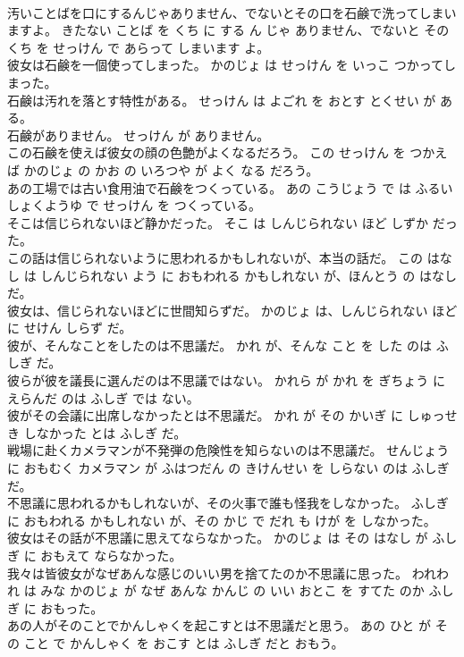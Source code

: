 \documentclass[8pt]{extreport}
\begin{document}
\begin{CJK}{UTF8}{min}
\\	汚いことばを口にするんじゃありません、でないとその口を石鹸で洗ってしまいますよ。	きたない ことば を くち に する ん じゃ ありません、でないと その くち を せっけん で あらって しまいます よ。	
\\	彼女は石鹸を一個使ってしまった。	かのじょ は せっけん を いっこ つかってしまった。	
\\	石鹸は汚れを落とす特性がある。	せっけん は よごれ を おとす とくせい が ある。	
\\	石鹸がありません。	せっけん が ありません。	
\\	この石鹸を使えば彼女の顔の色艶がよくなるだろう。	この せっけん を つかえば かのじょ の かお の いろつや が よく なる だろう。	
\\	あの工場では古い食用油で石鹸をつくっている。	あの こうじょう で は ふるい しょくようゆ で せっけん を つくっている。	
\\	そこは信じられないほど静かだった。	そこ は しんじられない ほど しずか だった。	
\\	この話は信じられないように思われるかもしれないが、本当の話だ。	この はなし は しんじられない よう に おもわれる かもしれない が、ほんとう の はなし だ。	
\\	彼女は、信じられないほどに世間知らずだ。	かのじょ は、しんじられない ほど に せけん しらず だ。	
\\	彼が、そんなことをしたのは不思議だ。	かれ が、そんな こと を した のは ふしぎ だ。	
\\	彼らが彼を議長に選んだのは不思議ではない。	かれら が かれ を ぎちょう に えらんだ のは ふしぎ では ない。	
\\	彼がその会議に出席しなかったとは不思議だ。	かれ が その かいぎ に しゅっせき しなかった とは ふしぎ だ。	
\\	戦場に赴くカメラマンが不発弾の危険性を知らないのは不思議だ。	せんじょう に おもむく カメラマン が ふはつだん の きけんせい を しらない のは ふしぎ だ。	
\\	不思議に思われるかもしれないが、その火事で誰も怪我をしなかった。	ふしぎ に おもわれる かもしれない が、その かじ で だれ も けが を しなかった。	
\\	彼女はその話が不思議に思えてならなかった。	かのじょ は その はなし が ふしぎ に おもえて ならなかった。	
\\	我々は皆彼女がなぜあんな感じのいい男を捨てたのか不思議に思った。	われわれ は みな かのじょ が なぜ あんな かんじ の いい おとこ を すてた のか ふしぎ に おもった。	
\\	あの人がそのことでかんしゃくを起こすとは不思議だと思う。	あの ひと が その こと で かんしゃく を おこす とは ふしぎ だと おもう。	

\end{CJK}
\end{document}
